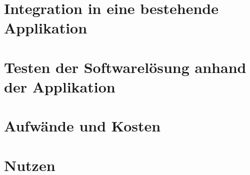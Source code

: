 
\section{Integration in eine bestehende Applikation}
\textit{\lipsum[1]}

\section{Testen der Softwarelösung anhand der Applikation}
\textit{\lipsum[1]}

\section{Aufwände und Kosten}
\textit{\lipsum[1]}

\section{Nutzen}
\textit{\lipsum[1]}